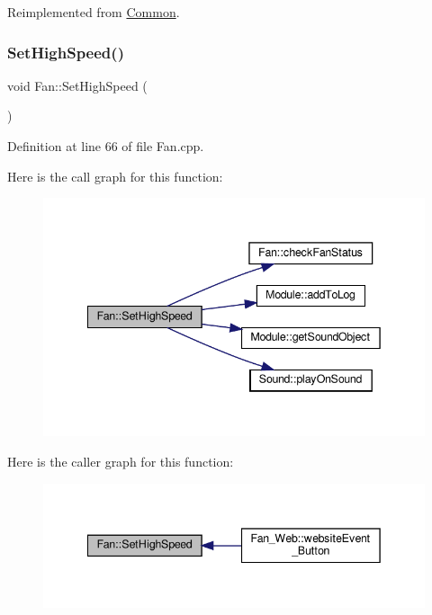 Reimplemented from \hyperlink{class_common_a9e60e2c26a5f4d72342a59a969954636}{Common}.

\mbox{\label{class_fan_ad462f4c80b5024a1266e0a070527425e}} 
\subsubsection{\texorpdfstring{Set\+High\+Speed()}{SetHighSpeed()}\hspace{0.1cm}{\footnotesize\ttfamily [1/2]}}
{\footnotesize\ttfamily void Fan\+::\+Set\+High\+Speed (\begin{DoxyParamCaption}{ }\end{DoxyParamCaption})\hspace{0.3cm}{\ttfamily [protected]}}



Definition at line 66 of file Fan.\+cpp.

Here is the call graph for this function\+:
\nopagebreak
\begin{figure}[H]
\begin{center}
\leavevmode
\includegraphics[width=342pt]{class_fan_ad462f4c80b5024a1266e0a070527425e_cgraph}
\end{center}
\end{figure}
Here is the caller graph for this function\+:
\nopagebreak
\begin{figure}[H]
\begin{center}
\leavevmode
\includegraphics[width=342pt]{class_fan_ad462f4c80b5024a1266e0a070527425e_icgraph}
\end{center}
\end{figure}
\mbox{\label{class_fan_ad462f4c80b5024a1266e0a070527425e}} 
